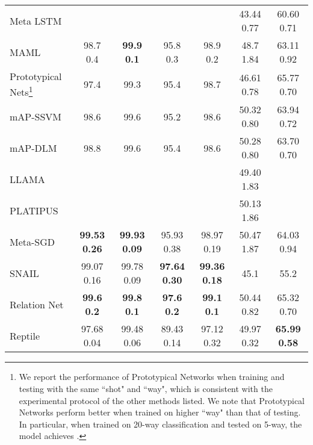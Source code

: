 \documentclass{article}
\begin{document}
\begin{table}[h]
{{\begin{tabular}{ p{40mm} c c c c c c}
 Meta LSTM \newline \citep{ravi2016optimization}            & & & & & 43.44  0.77 & 60.60  0.71\\
 MAML \newline \citep{finn2017model}                        & 98.7  0.4 & \textbf{99.9  0.1} & 95.8  0.3 & 98.9  0.2 & 48.7  1.84 & 63.11  0.92 \\
 Prototypical Nets\footnote{\scriptsize We report the performance of Prototypical Networks when training and testing with the same ``shot" and ``way", which is consistent with the experimental protocol of the other methods listed. We note that Prototypical Networks perform better when trained on higher ``way" than that of testing. In particular, when trained on 20-way classification and tested on 5-way, the model achieves .} \newline \citep{snell2017prototypical}   & 97.4 & 99.3 & 95.4 & 98.7 & 46.61  0.78 & 65.77  0.70 \\
 mAP-SSVM \newline \citep{triantafillou2017few}             & 98.6 & 99.6 & 95.2 & 98.6 & 50.32  0.80 & 63.94  0.72 \\
 mAP-DLM \newline \citep{triantafillou2017few}              & 98.8 & 99.6 & 95.4 & 98.6 & 50.28  0.80 & 63.70  0.70 \\
 LLAMA \newline \citep{grant2018recasting}                  & & & & & 49.40  1.83 & \\
 PLATIPUS \newline \citep{finn2018probabilistic}            & & & & & 50.13  1.86 & \\
 Meta-SGD \newline \citep{li2017meta}                       & \textbf{99.53  0.26} & \textbf{99.93  0.09} & 95.93  0.38 & 98.97  0.19 & 50.47  1.87 & 64.03  0.94 \\
 SNAIL \newline \citep{mishra2018simple}                    & 99.07  0.16 & 99.78  0.09 & \textbf{97.64  0.30} & \textbf{99.36  0.18} & 45.1 & 55.2 \\
 Relation Net \newline \citep{yang2018learning}             & \textbf{99.6  0.2} & \textbf{99.8  0.1} & \textbf{97.6  0.2} & \textbf{99.1  0.1} & 50.44  0.82 & 65.32  0.70 \\
 Reptile \newline \citep{nichol2018reptile}                 & 97.68  0.04 & 99.48  0.06 & 89.43  0.14 & 97.12  0.32 & 49.97  0.32 & \textbf{65.99  0.58} \\

\end{tabular}}}
\end{table}
\end{document}
